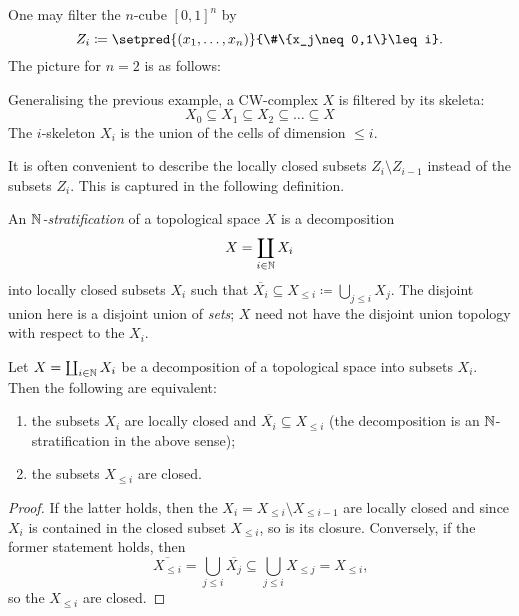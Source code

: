 \begin{exmp}
One may filter the \(n\)-cube \([0,1]^n\) by
\[ Z_i \coloneq \setpred{(x_1,\ldots,x_n)}{\#\{x_j\neq 0,1\}\leq i}\text{.} \]
The picture for \(n=2\) is as follows:
\begin{center}
\end{center}
\end{exmp}

\begin{exmp}
Generalising the previous example, a CW-complex \(X\) is filtered by its skeleta:
\[ X_0 \subseteq X_1 \subseteq X_2 \subseteq\ldots \subseteq X\]
The \(i\)-skeleton \(X_i\) is the union of the cells of dimension \(\leq i\).
\end{exmp}

It is often convenient to describe the locally closed subsets \(Z_i\setminus Z_{i-1}\) instead of the subsets \(Z_i\).
This is captured in the following definition.

\begin{defn}\label{defn:N-stratification}
An \emph{\(\mathbb{N}\)-stratification} of a topological space \(X\) is a decomposition
\[ X = \coprod_{i\in\mathbb{N}}X_i \]
into locally closed subsets \(X_i\) such that \(\overline{X_i}\subseteq X_{\leq i}\coloneq\bigcup_{j\leq i}X_j\).
The disjoint union here is a disjoint union of \emph{sets}; \(X\) need not have the disjoint union topology with respect to the \(X_i\).
\end{defn}

\begin{lem}
Let \(X=\coprod_{i\in\mathbb{N}}X_i\) be a decomposition of a topological space into subsets \(X_i\).
Then the following are equivalent:
\begin{enumerate}
\item the subsets \(X_i\) are locally closed and \(\overline{X_i}\subseteq X_{\leq i}\) (the decomposition is an \(\mathbb{N}\)-stratification in the above sense);
\item the subsets \(X_{\leq i}\) are closed.
\end{enumerate}
\end{lem}
\begin{proof}
If the latter holds, then the \(X_i=X_{\leq i}\setminus X_{\leq i-1}\) are locally closed and since \(X_i\) is contained in the closed subset \(X_{\leq i}\), so is its closure.
Conversely, if the former statement holds, then
\[ \overline{X_{\leq i}} = \bigcup_{j\leq i}\overline{X_j} \subseteq \bigcup_{j\leq i}X_{\leq j} = X_{\leq i}\text{,} \]
so the \(X_{\leq i}\) are closed.
\end{proof}


